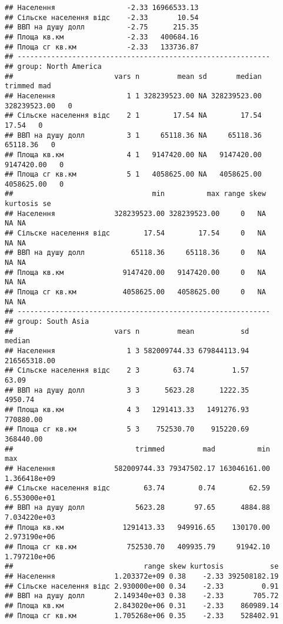 \documentclass[
]{article}
\begin{document}
\begin{verbatim}
## Населення                 -2.33 16966533.13
## Сільске населення відс    -2.33       10.54
## ВВП на душу долл          -2.75      215.35
## Площа кв.км               -2.33   400684.16
## Площа сг кв.км            -2.33   133736.87
## ------------------------------------------------------------ 
## group: North America
##                        vars n         mean sd       median      trimmed mad
## Населення                 1 1 328239523.00 NA 328239523.00 328239523.00   0
## Сільске населення відс    2 1        17.54 NA        17.54        17.54   0
## ВВП на душу долл          3 1     65118.36 NA     65118.36     65118.36   0
## Площа кв.км               4 1   9147420.00 NA   9147420.00   9147420.00   0
## Площа сг кв.км            5 1   4058625.00 NA   4058625.00   4058625.00   0
##                                 min          max range skew kurtosis se
## Населення              328239523.00 328239523.00     0   NA       NA NA
## Сільске населення відс        17.54        17.54     0   NA       NA NA
## ВВП на душу долл           65118.36     65118.36     0   NA       NA NA
## Площа кв.км              9147420.00   9147420.00     0   NA       NA NA
## Площа сг кв.км           4058625.00   4058625.00     0   NA       NA NA
## ------------------------------------------------------------ 
## group: South Asia
##                        vars n         mean           sd       median
## Населення                 1 3 582009744.33 679844113.94 216565318.00
## Сільске населення відс    2 3        63.74         1.57        63.09
## ВВП на душу долл          3 3      5623.28      1222.35      4950.74
## Площа кв.км               4 3   1291413.33   1491276.93    770880.00
## Площа сг кв.км            5 3    752530.70    915220.69    368440.00
##                             trimmed         mad          min          max
## Населення              582009744.33 79347502.17 163046161.00 1.366418e+09
## Сільске населення відс        63.74        0.74        62.59 6.553000e+01
## ВВП на душу долл            5623.28       97.65      4884.88 7.034220e+03
## Площа кв.км              1291413.33   949916.65    130170.00 2.973190e+06
## Площа сг кв.км            752530.70   409935.79     91942.10 1.797210e+06
##                               range skew kurtosis           se
## Населення              1.203372e+09 0.38    -2.33 392508182.19
## Сільске населення відс 2.930000e+00 0.34    -2.33         0.91
## ВВП на душу долл       2.149340e+03 0.38    -2.33       705.72
## Площа кв.км            2.843020e+06 0.31    -2.33    860989.14
## Площа сг кв.км         1.705268e+06 0.35    -2.33    528402.91

\end{verbatim}
\end{document}
